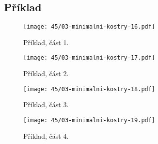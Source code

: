 \subsection*{Příklad}

\begin{figure}[H]
    \centering
    \texttt{[image: 45/03-minimalni-kostry-16.pdf]}
    \caption{Příklad, část 1.}
\end{figure}

\begin{figure}[H]
    \centering
    \texttt{[image: 45/03-minimalni-kostry-17.pdf]}
    \caption{Příklad, část 2.}
\end{figure}

\begin{figure}[H]
    \centering
    \texttt{[image: 45/03-minimalni-kostry-18.pdf]}
    \caption{Příklad, část 3.}
\end{figure}

\begin{figure}[H]
    \centering
    \texttt{[image: 45/03-minimalni-kostry-19.pdf]}
    \caption{Příklad, část 4.}
\end{figure}

